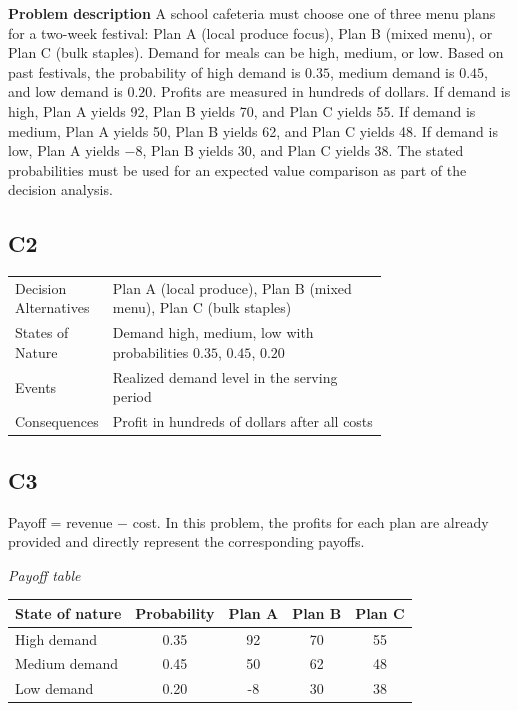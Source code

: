	\begin{ExamProblems}
		\item
		\textbf{Problem description}
		A school cafeteria must choose one of three menu plans for a two-week festival: Plan A (local produce focus),
		Plan B (mixed menu), or Plan C (bulk staples). Demand for meals can be high, medium, or low. Based on past festivals, the probability of high demand is $0.35$, medium demand is $0.45$, and low demand is $0.20$. Profits are measured in hundreds of dollars. If demand is high, Plan A yields 92, Plan B yields 70, and Plan C yields 55. If demand is medium, Plan A yields 50, Plan B yields 62, and Plan C yields 48. If demand is low, Plan A yields $-8$, Plan B yields 30, and Plan C yields 38. The stated probabilities must be used for an expected value comparison as part of the decision analysis.

		\subsection*{C2}
		\begin{center}
			\begin{tabular}{l p{0.74\linewidth}}
				\toprule
				Decision Alternatives & Plan A (local produce), Plan B (mixed menu), Plan C (bulk staples) \\
				States of Nature & Demand high, medium, low with probabilities $0.35$, $0.45$, $0.20$ \\
				Events & Realized demand level in the serving period \\
				Consequences & Profit in hundreds of dollars after all costs \\
				\bottomrule
			\end{tabular}
		\end{center}

		\subsection*{C3}
		Payoff = revenue $-$ cost. In this problem, the profits for each plan are already provided and directly represent the corresponding payoffs.
		\begin{center}
			\textit{Payoff table} \\
			\begin{tabular}{l c c c c}
				\toprule
				State of nature & Probability & Plan A & Plan B & Plan C \\
				\midrule
				High demand & 0.35 & 92 & 70 & 55 \\
				Medium demand & 0.45 & 50 & 62 & 48 \\
				Low demand & 0.20 & -8 & 30 & 38 \\
				\bottomrule
			\end{tabular}
		\end{center}


\end{ExamProblems}
